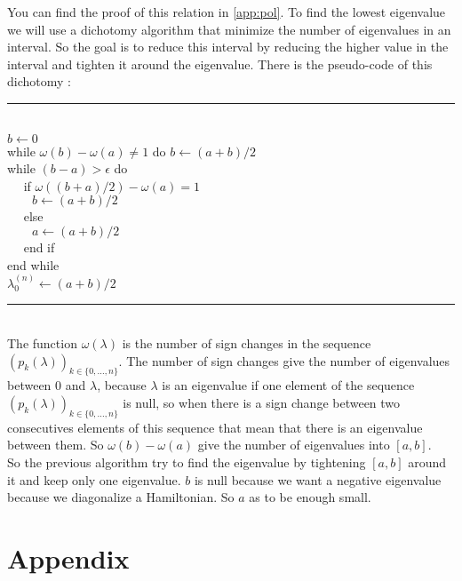 \documentclass[1pt, a4paper]{article}
\begin{document}
You can find the proof of this relation in \autoref{app:pol}. To find the lowest eigenvalue we will use a dichotomy algorithm that minimize the number of eigenvalues in an interval. So the goal is to reduce this interval by reducing the higher value in the interval and tighten it around the eigenvalue. There is the pseudo-code of this dichotomy :\\
\hrule
\noindent
\\
$b\leftarrow 0$\\
while $\omega(b)-\omega(a)\ne 1$ do $b\leftarrow (a + b)/2$\\
while $(b-a) > \epsilon$ do\\
$\quad$ if $\omega ((b+a)/2) - \omega(a) = 1$\\
$\qquad b\leftarrow (a + b)/2$\\
$\quad$ else\\
$\qquad a\leftarrow (a + b)/2$\\
$\quad$ end if\\
end while\\
$\lambda^{(n)}_0 \leftarrow (a + b) / 2$\\
\hrule
\noindent
\\
The function $\omega(\lambda)$ is the number of sign changes in the sequence $(p_k(\lambda))_{k\in \{0,\dots,n\}}$. The number of sign changes give the number of eigenvalues between $0$ and $\lambda$, because $\lambda$ is an eigenvalue if one element of the sequence $(p_k(\lambda))_{k\in \{0,\dots,n\}}$ is null, so when there is a sign change between two consecutives elements of this sequence that mean that there is an eigenvalue between them. So $\omega(b)-\omega(a)$ give the number of eigenvalues into $[a, b]$.\\
So the previous algorithm try to find the eigenvalue by tightening $[a, b]$ around it and keep only one eigenvalue. $b$ is null because we want a negative eigenvalue because we diagonalize a Hamiltonian. So $a$ as to be enough small.
 
\newpage\noindent
\section{Appendix}
\label{app:app}
\end{document}
